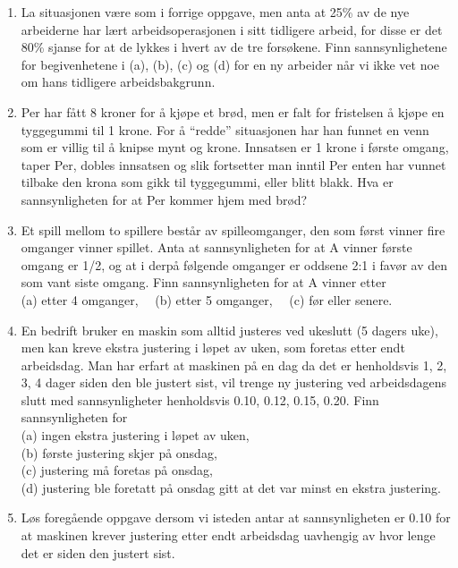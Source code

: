 \begin{enumerate}
\item La situasjonen være som i forrige oppgave, men anta at 25\%
     av de nye arbeiderne har lært arbeidsoperasjonen i sitt
     tidligere arbeid, for disse er det 80\% sjanse for at de
     lykkes i hvert av de tre forsøkene. Finn sannsynlighetene
     for begivenhetene i (a), (b), (c) og (d) for en ny arbeider
     når vi ikke vet noe om hans tidligere arbeidsbakgrunn.

\item  Per har fått 8 kroner for å kjøpe et brød, men er falt for
     fristelsen å kjøpe en tyggegummi til 1 krone. For å ``redde''
     situasjonen har han funnet en venn som er villig til å
     knipse mynt og krone. Innsatsen er 1 krone i første omgang,
     taper Per, dobles innsatsen og slik fortsetter man inntil
     Per enten har vunnet tilbake den krona som gikk til tyggegummi,
     eller blitt blakk. Hva er sannsynligheten for at Per kommer
     hjem med brød?

\item  Et spill mellom to spillere består av spilleomganger, den
     som først vinner fire omganger vinner spillet. Anta at
     sannsynligheten for at A vinner første omgang er 1/2, og at
     i derpå følgende omganger er oddsene 2:1 i favør av den som
     vant siste omgang. Finn sannsynligheten for at A vinner etter \\
     (a)  etter 4 omganger,\mbox{\ \ } (b)  etter 5 omganger,\mbox{\ \ }
     (c)  før eller senere.

\item  En bedrift bruker en maskin som alltid justeres ved ukeslutt
     (5 dagers uke), men kan kreve ekstra justering i løpet av
     uken, som foretas etter endt arbeids\-dag. Man har erfart at
     maskinen på en dag da det er henholdsvis 1, 2, 3, 4 dager
     siden den ble justert sist, vil trenge ny justering ved
     arbeidsdagens slutt med sannsynligheter henholdsvis 0.10,
     0.12, 0.15, 0.20. Finn sannsynligheten for\\
     (a)  ingen ekstra justering i løpet av uken,\\
     (b)  første justering skjer på onsdag,\\
     (c)  justering må foretas på onsdag,\\
     (d)  justering ble foretatt på onsdag gitt at det var minst
          en ekstra justering.

\item Løs foregående oppgave dersom vi isteden antar at
      sannsynligheten er 0.10 for at maskinen krever justering etter endt 
      arbeidsdag uavhengig av hvor lenge det er siden den justert sist.


\end{enumerate}

